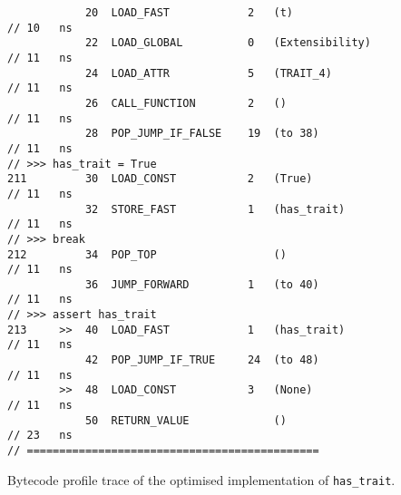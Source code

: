 \begin{code}
\begin{verbatim}
            20  LOAD_FAST            2   (t)                                                        // 10   ns
            22  LOAD_GLOBAL          0   (Extensibility)                                            // 11   ns
            24  LOAD_ATTR            5   (TRAIT_4)                                                  // 11   ns
            26  CALL_FUNCTION        2   ()                                                         // 11   ns
            28  POP_JUMP_IF_FALSE    19  (to 38)                                                    // 11   ns
// >>> has_trait = True
211         30  LOAD_CONST           2   (True)                                                     // 11   ns
            32  STORE_FAST           1   (has_trait)                                                // 11   ns
// >>> break
212         34  POP_TOP                  ()                                                         // 11   ns
            36  JUMP_FORWARD         1   (to 40)                                                    // 11   ns
// >>> assert has_trait
213     >>  40  LOAD_FAST            1   (has_trait)                                                // 11   ns
            42  POP_JUMP_IF_TRUE     24  (to 48)                                                    // 11   ns
        >>  48  LOAD_CONST           3   (None)                                                     // 11   ns
            50  RETURN_VALUE             ()                                                         // 23   ns
// =============================================
    \end{verbatim}
    \caption{Bytecode profile trace of the optimised implementation of \texttt{has_trait}.}
    \label{listing:bytecode-profiles-hastrait-optimised}
\end{code}










